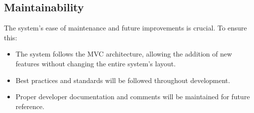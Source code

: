 \subsection{Maintainability}
The system's ease of maintenance and future improvements is crucial. To ensure this:

\begin{itemize}
\itemsep0em 
    \item The system follows the MVC architecture, allowing the addition of new features without changing the entire system's layout.
    \item Best practices and standards will be followed throughout development.
    \item Proper developer documentation and comments will be maintained for future reference.
\end{itemize}
